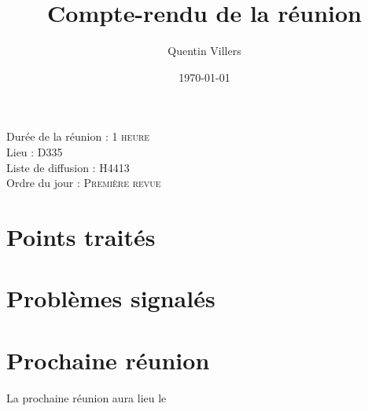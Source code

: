 \documentclass[12pt]{article}
\newcommand{\ordre}[1]{Ordre du jour : \textsc{#1}\\}
\newcommand{\duree}[1]{Durée de la réunion : \textsc{#1}\\}
\newcommand{\liste}[1]{Liste de diffusion : \textsc{#1}\\}
\newcommand{\lieu}[1]{Lieu : \textsc{#1}\\}
\begin{document}
\title{Compte-rendu de la réunion}
\author{Quentin Villers}
\date{\today}
\maketitle

\begin{center}
\duree{1 heure}
\lieu{D335}
\liste{H4413}
\ordre{Première revue}
\end{center}

\section{Points traités}

\section{Problèmes signalés}

\section{Prochaine réunion}
La prochaine réunion aura lieu le
\end{document}
